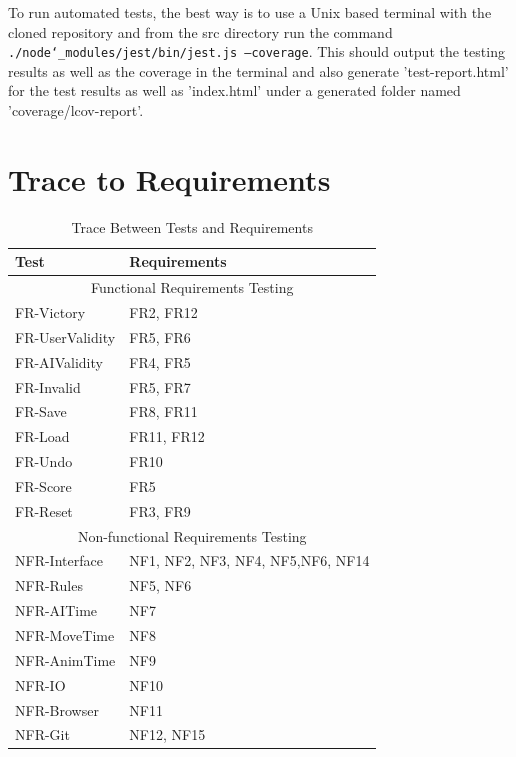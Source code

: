 \documentclass[12pt, titlepage]{article}
\begin{document}
To run automated tests, the best way is to use a Unix based terminal with the cloned repository and from the src directory run the command \texttt{./node\char`_modules/jest/bin/jest.js --coverage}. This should output the testing results as well as the coverage in the terminal and also generate 'test-report.html' for the test results as well as 'index.html' under a generated folder named 'coverage/lcov-report'.

\newpage
\section{Trace to Requirements}
\begin{table}[H]
	\caption{Trace Between Tests and Requirements}
	\begin{tabularx}{\textwidth}{ll}
		\toprule
		Test            & Requirements                          \\
		\midrule
		\multicolumn{2}{c}{Functional Requirements Testing}     \\
		\midrule
		FR-Victory      & FR2, FR12                             \\
		FR-UserValidity & FR5, FR6                              \\
		FR-AIValidity   & FR4, FR5                              \\
		FR-Invalid      & FR5, FR7                              \\
		FR-Save         & FR8, FR11                             \\
		FR-Load         & FR11,  FR12                           \\
		FR-Undo         & FR10                                  \\
		FR-Score        & FR5                                   \\
		FR-Reset        & FR3, FR9                              \\

		\midrule
		\multicolumn{2}{c}{Non-functional Requirements Testing} \\
		\midrule
		NFR-Interface   & NF1, NF2, NF3, NF4, NF5,NF6, NF14     \\
		NFR-Rules       & NF5, NF6                              \\
		NFR-AITime      & NF7                                   \\
		NFR-MoveTime    & NF8                                   \\
		NFR-AnimTime    & NF9                                   \\
		NFR-IO          & NF10                                  \\
		NFR-Browser     & NF11                                  \\
		NFR-Git         & NF12, NF15                            \\
		\bottomrule
	\end{tabularx}
\end{table}
\end{document}
